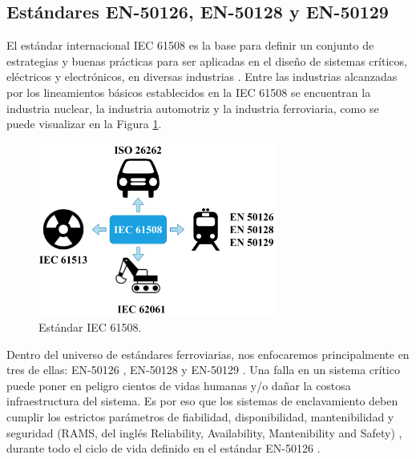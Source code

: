 \subsection{Estándares EN-50126, EN-50128 y EN-50129}
	\label{sec:normas}
	
    El estándar internacional IEC 61508 \cite{Paper_77,Paper_78,Paper_79,Paper_80,Paper_81,Paper_82,Paper_83} es la base para definir un conjunto de estrategias y buenas prácticas para ser aplicadas en el diseño de sistemas críticos, eléctricos y electrónicos, en diversas industrias \cite{Paper_26,Paper_29,Paper_30,Paper_31,Paper_34,Paper_47,Paper_56,Paper_69,Paper_92}. Entre las industrias alcanzadas por los lineamientos básicos establecidos en la IEC 61508 se encuentran la industria nuclear, la industria automotriz y la industria ferroviaria, como se puede visualizar en la Figura \ref{fig:IEC_61508}.

    \begin{figure}[H]
        \centering
        \includegraphics[width=0.7\textwidth]{Figuras/IEC61508.png}
        \centering\caption{Estándar IEC 61508.}
        \label{fig:IEC_61508}
    \end{figure}

    Dentro del universo de estándares ferroviarias, nos enfocaremos principalmente en tres de ellas: EN-50126 \cite{Paper_70,Paper_71,Paper_72,Paper_73,Paper_74}, EN-50128 \cite{Paper_75,Paper_74} y EN-50129 \cite{Paper_76,Paper_73}. Una falla en un sistema crítico puede poner en peligro cientos de vidas humanas y/o dañar la costosa infraestructura del sistema. Es por eso que los sistemas de enclavamiento deben cumplir los estrictos parámetros de fiabilidad, disponibilidad, mantenibilidad y seguridad (RAMS, del inglés Reliability, Availability, Mantenibility and Safety) \cite{Paper_153}, durante todo el ciclo de vida definido en el estándar EN-50126 \cite{Paper_70,Paper_66,Paper_84}.

